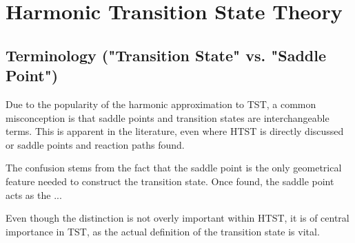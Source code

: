 \section{Harmonic Transition State Theory}
\label{sec:htst}


\subsection{Terminology ("Transition State" vs. "Saddle Point")}
Due to the popularity of the harmonic approximation to TST, a common misconception is that saddle points and transition states are interchangeable terms.
This is apparent in the literature, even where HTST is directly discussed or saddle points and reaction paths found.

The confusion stems from the fact that the saddle point is the only geometrical feature needed to construct the transition state.
Once found, the saddle point acts as the ... 

Even though the distinction is not overly important within HTST, it is of central importance in TST, as the actual definition of the transition state is vital.

\placeholder

